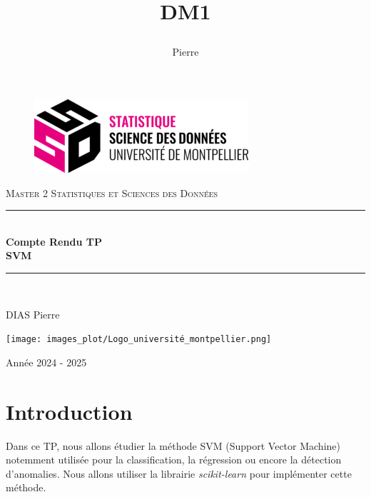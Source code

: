 \documentclass[11pt,a4paper]{article}
\author{\DIAS Pierre}
\date{ }
\title{\begin{huge} \textbf{DM1}\end{huge}}
\begin{document}
\begin{titlepage}

\newcommand{\HRule}{\rule{\linewidth}{0.5mm}}
\center 


\begin{figure}
    \centering
    \includegraphics[width=0.5\linewidth]{images_plot/ssd_logo_couleur_noir-300x103.png}
\end{figure}



\textsc{\Large Master 2 Statistiques et Sciences des Données }\\[1cm] %
\HRule \\[0.4cm]
{ \huge \bfseries Compte Rendu TP \\  SVM}\\[0.4cm]
\HRule \\[1.5cm]
\begin{center}
\begin{Large}
DIAS Pierre
\end{Large}
\end{center}
    

\begin{center}

\vfill{\texttt{[image: images\_plot/Logo\_université\_montpellier.png]}\vspace{0.5cm}\\
\begin{Large} Année 2024 - 2025 \\
\end{Large}}



\end{center}

\end{titlepage}
\pagebreak

\tableofcontents
\pagebreak


\section{Introduction}
 Dans ce TP, nous allons étudier la méthode SVM (Support Vector Machine) notemment utilisée
 pour la classification, la régression ou encore la détection d’anomalies. Nous allons utiliser la
 librairie \colorbox{gray!15}{\textit{scikit-learn}} pour implémenter cette méthode.
\end{document}
